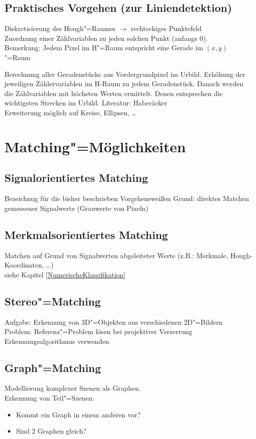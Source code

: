 \documentclass[a4paper,12pt]{scrreprt}
\begin{document}
\subsection{Praktisches Vorgehen (zur Liniendetektion)}
Diskretisierung des Hough"=Raumes $\rightarrow$ rechteckiges
Punktefeld\\
Zuordnung einer Zählvariablen zu jeden solchen Punkt (anfangs 0).\\
Bemerkung: Jedem Pixel im H"=Raum entspricht eine Gerade im
$(x,y)$"=Raum

Berechnung aller Geradenstücke aus Vordergrundpixel im Urbild.
Erhöhung der jeweiligen Zählervariablen im H-Raum zu jedem
Geradenstück. Danach werden die Zählvariablen mit höchsten Werten
ermittelt. Denen entsprechen die wichtigsten Strecken im Urbild. 
Literatur: Haberäcker\\
Erweiterung möglich auf Kreise, Ellipsen, \dots\\


\section{Matching"=Möglichkeiten}
\subsection{Signalorientiertes Matching} 
Bezeichnug für die bisher beschrieben Vorgehensweißen
Grund: direktes Matchen gemessener Signalwerte (Grauwerte von Pixeln)

\subsection{Merkmalsorientiertes Matching}
Matchen auf Grund von Signalwerten abgeleiteter Werte (z.B.: Merkmale, Hough-Koordinaten, \dots)\\
siehe Kapitel \ref{NumerischeKlassifikation}\\

\subsection{Stereo"=Matching}
Aufgabe: Erkennung von 3D"=Objekten aus verschiedenen 2D"=Bildern\\
Problem: Referenz"=Problem lösen bei projektiver Verzerrung
Erkennungsalgorithmus verwenden\\

\subsection{Graph"=Matching} Modellierung komplexer Szenen als
Graphen.\\ Erkennung von Teil"=Szenen:\begin{itemize}
	\item Kommt ein Graph in einem anderen vor?
	\item Sind 2 Graphen gleich?
	\end{itemize}
\end{document}
